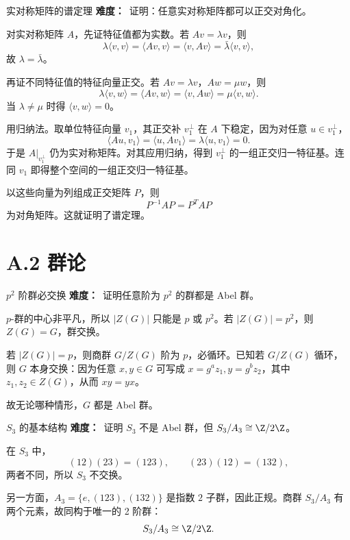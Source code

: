 \begin{problem}{实对称矩阵的谱定理}
\textbf{难度：}\hard\ 证明：任意实对称矩阵都可以正交对角化。
\end{problem}
\begin{solution}
对实对称矩阵 $A$，先证特征值都为实数。若 $Av=\lambda v$，则
\[
\lambda\langle v,v\rangle=\langle Av,v\rangle=\langle v,Av\rangle=\bar\lambda\langle v,v\rangle,
\]
故 $\lambda=\bar\lambda$。

再证不同特征值的特征向量正交。若 $Av=\lambda v$，$Aw=\mu w$，则
\[
\lambda\langle v,w\rangle=\langle Av,w\rangle=\langle v,Aw\rangle=\mu\langle v,w\rangle.
\]
当 $\lambda\neq\mu$ 时得 $\langle v,w\rangle=0$。

用归纳法。取单位特征向量 $v_1$，其正交补 $v_1^\perp$ 在 $A$ 下稳定，因为对任意 $u\in v_1^\perp$，
\[
\langle Au,v_1\rangle=\langle u,Av_1\rangle=\lambda\langle u,v_1\rangle=0.
\]
于是 $A|_{v_1^\perp}$ 仍为实对称矩阵。对其应用归纳，得到 $v_1^\perp$ 的一组正交归一特征基。连同 $v_1$ 即得整个空间的一组正交归一特征基。

以这些向量为列组成正交矩阵 $P$，则
\[
P^{-1}AP=P^TAP
\]
为对角矩阵。这就证明了谱定理。
\end{solution}

\section{A.2 群论}

\begin{problem}{$p^2$ 阶群必交换}
\textbf{难度：}\easy\ 证明任意阶为 $p^2$ 的群都是 Abel 群。
\end{problem}
\begin{solution}
$p$-群的中心非平凡，所以 $|Z(G)|$ 只能是 $p$ 或 $p^2$。若 $|Z(G)|=p^2$，则 $Z(G)=G$，群交换。

若 $|Z(G)|=p$，则商群 $G/Z(G)$ 阶为 $p$，必循环。已知若 $G/Z(G)$ 循环，则 $G$ 本身交换：因为任意 $x,y\in G$ 可写成 $x=g^az_1,y=g^bz_2$，其中 $z_1,z_2\in Z(G)$，从而 $xy=yx$。

故无论哪种情形，$G$ 都是 Abel 群。
\end{solution}

\begin{problem}{$S_3$ 的基本结构}
\textbf{难度：}\easy\ 证明 $S_3$ 不是 Abel 群，但 $S_3/A_3\cong \Z/2\Z$。
\end{problem}
\begin{solution}
在 $S_3$ 中，
\[
(12)(23)=(123),\qquad (23)(12)=(132),
\]
两者不同，所以 $S_3$ 不交换。

另一方面，$A_3=\{e,(123),(132)\}$ 是指数 $2$ 子群，因此正规。商群 $S_3/A_3$ 有两个元素，故同构于唯一的 2 阶群：
\[
S_3/A_3\cong \Z/2\Z.
\]
\end{solution}

